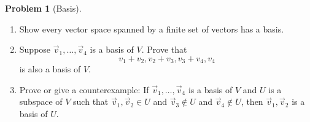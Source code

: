\documentclass[12pt]{article}
\theoremstyle{definition}
\newtheorem{problem}{Problem}
\begin{document}
\begin{problem}[Basis]~
\begin{enumerate}
    \item Show every vector space spanned by a finite set of vectors has a basis.
    \item Suppose $\vec{v}_1, \ldots, \vec{v}_4$ is a basis of $V$. Prove that 
    \[ v_1 + v_2, v_2+v_3, v_3+v_4, v_4 \]
    is also a basis of $V$.
    \item Prove or give a counterexample: If $\vec{v}_1, \ldots, \vec{v}_4$ is a basis of $V$ and $U$ is a
    subspace of $V$ such that $\vec{v}_1, \vec{v}_2\in U$ and $\vec{v}_3\not\in U$ and $\vec{v}_4\not\in U$, then $\vec{v}_1, \vec{v}_2$ is a basis of $U$.
\end{enumerate}
\end{problem}
\end{document}
